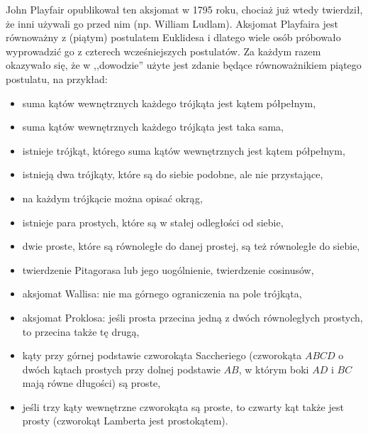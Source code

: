 John Playfair opublikował ten aksjomat w 1795 roku, chociaż już wtedy twierdził, że inni używali go przed nim (np. William Ludlam).
%
Aksjomat Playfaira jest równoważny z (piątym) postulatem Euklidesa i dlatego wiele osób próbowało wyprowadzić go z czterech wcześniejszych postulatów.
Za każdym razem okazywało się, że w ,,dowodzie'' użyte jest zdanie będące równoważnikiem piątego postulatu, na przykład:
\begin{itemize}
    \item suma kątów wewnętrznych każdego trójkąta jest kątem półpełnym, %
    \item suma kątów wewnętrznych każdego trójkąta jest taka sama, %
    \item istnieje trójkąt, którego suma kątów wewnętrznych jest kątem półpełnym, %
    \item istnieją dwa trójkąty, które są do siebie podobne, ale nie przystające,  %
    \item na każdym trójkącie można opisać okrąg, 
    \item istnieje para prostych, które są w stałej odległości od siebie,
    \item dwie proste, które są równoległe do danej prostej, są też równoległe do siebie, 
    \item twierdzenie Pitagorasa lub jego uogólnienie, twierdzenie cosinusów,  
    \item aksjomat Wallisa: nie ma górnego ograniczenia na pole trójkąta, 
    \item aksjomat Proklosa: jeśli prosta przecina jedną z dwóch równoległych prostych, to przecina także tę drugą, 
    \item kąty przy górnej podstawie czworokąta Saccheriego (czworokąta $ABCD$ o dwóch kątach prostych przy dolnej podstawie $AB$, w którym boki $AD$ i $BC$ mają równe długości) są proste, 
    \item jeśli trzy kąty wewnętrzne czworokąta są proste, to czwarty kąt także jest prosty (czworokąt Lamberta jest prostokątem). 
\end{itemize}


